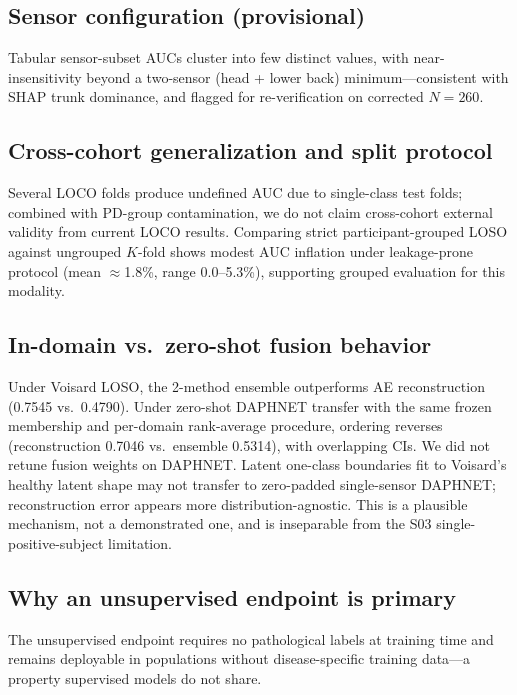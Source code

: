 \subsection{Sensor configuration (provisional)}

Tabular sensor-subset AUCs cluster into few distinct values, with near-insensitivity beyond a two-sensor (head + lower back) minimum---consistent with SHAP trunk dominance, and flagged for re-verification on corrected $N=260$.

\subsection{Cross-cohort generalization and split protocol}

Several LOCO folds produce undefined AUC due to single-class test folds; combined with PD-group contamination, we do not claim cross-cohort external validity from current LOCO results. Comparing strict participant-grouped LOSO against ungrouped $K$-fold shows modest AUC inflation under leakage-prone protocol (mean $\approx$1.8\%, range 0.0--5.3\%), supporting grouped evaluation for this modality.

\subsection{In-domain vs.\ zero-shot fusion behavior}

Under Voisard LOSO, the 2-method ensemble outperforms AE reconstruction (0.7545 vs.\ 0.4790). Under zero-shot DAPHNET transfer with the same frozen membership and per-domain rank-average procedure, ordering reverses (reconstruction 0.7046 vs.\ ensemble 0.5314), with overlapping CIs. We did not retune fusion weights on DAPHNET. Latent one-class boundaries fit to Voisard's healthy latent shape may not transfer to zero-padded single-sensor DAPHNET; reconstruction error appears more distribution-agnostic. This is a plausible mechanism, not a demonstrated one, and is inseparable from the S03 single-positive-subject limitation.

\subsection{Why an unsupervised endpoint is primary}

The unsupervised endpoint requires no pathological labels at training time and remains deployable in populations without disease-specific training data---a property supervised models do not share.

